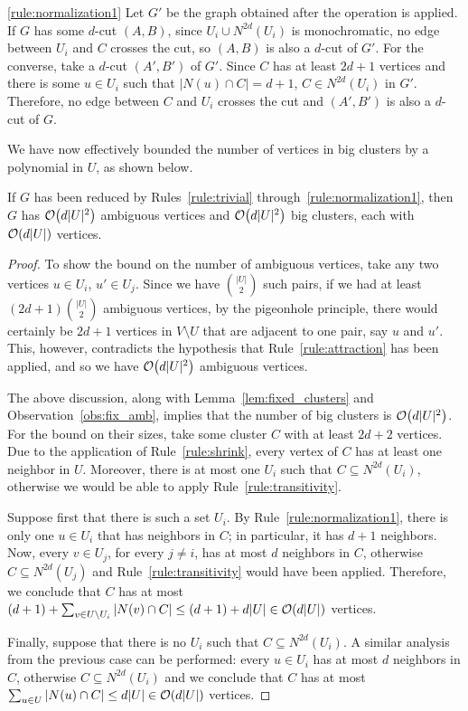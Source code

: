 \begin{sproof}{\ref{rule:normalization1}}
    Let $G'$ be the graph obtained after the operation is applied.
    If $G$ has some $d$-cut $(A,B)$, since $U_i \cup N^{2d}(U_i)$ is monochromatic, no edge between $U_i$ and $C$ crosses the cut, so $(A,B)$ is also a $d$-cut of $G'$.
    For the converse, take a $d$-cut $(A', B')$ of $G'$.
    Since $C$ has at least $2d+1$ vertices and there is some $u \in U_i$ such that $|N(u) \cap C| = d+1$, $C \in N^{2d}(U_i)$ in $G'$.
    Therefore, no edge between $C$ and $U_i$ crosses the cut and $(A', B')$ is also a $d$-cut of $G$.
\end{sproof}

We have now effectively bounded the number of vertices in big clusters by a polynomial in $U$, as shown below.

\begin{lemma}
    \label{lem:bound1}
    If $G$ has been reduced by Rules~\ref{rule:trivial} through~\ref{rule:normalization1}, then $G$ has $\mathcal{O}\!\left(d|U|^2\right)$ ambiguous vertices and $\mathcal{O}\!\left(d|U|^2\right)$ big clusters, each with $\mathcal{O}\!\left(d|U|\right)$ vertices.
\end{lemma}

\begin{proof}
    To show the bound on the number of ambiguous vertices, take any two vertices $u \in U_i$, $u' \in U_j$.
    Since we have $\binom{|U|}{2}$ such pairs, if we had at least $(2d + 1)\binom{|U|}{2}$ ambiguous vertices, by the pigeonhole principle, there would certainly be $2d+1$ vertices in $V \setminus U$ that are adjacent to one pair, say $u$ and $u'$.
    This, however, contradicts the hypothesis that Rule~\ref{rule:attraction} has been applied, and so we have $\mathcal{O}\!\left(d|U|^2\right)$ ambiguous vertices.

    The above discussion, along with Lemma~\ref{lem:fixed_clusters} and Observation~\ref{obs:fix_amb}, implies that the number of big clusters is $\mathcal{O}\!\left(d|U|^2\right)$.
    For the bound on their sizes, take some cluster $C$ with at least $2d + 2$ vertices.
    Due to the application of Rule~\ref{rule:shrink}, every vertex of $C$ has at least one neighbor in $U$.
    Moreover, there is at most one $U_i$ such that $C \subseteq N^{2d}(U_i)$, otherwise we would be able to apply Rule~\ref{rule:transitivity}.

    Suppose first that there is such a set $U_i$.
    By Rule~\ref{rule:normalization1}, there is only one $u \in U_i$ that has neighbors in $C$; in particular, it has $d+1$ neighbors.
    Now, every $v \in U_j$, for every $j\neq i$, has at most $d$ neighbors in $C$, otherwise $C \subseteq N^{2d}(U_j)$ and Rule~\ref{rule:transitivity} would have been applied.
    Therefore, we conclude that $C$ has at most $(d+1) +  \sum_{v \in U \setminus U_i} |N(v) \cap C| \leq (d+1) + d|U| \in \mathcal{O}\!\left(d|U|\right)$ vertices.

    Finally, suppose that there is no $U_i$ such that $C \subseteq N^{2d}(U_i)$.
    A similar analysis from the previous case can be performed: every $u \in U_i$ has at most $d$ neighbors in $C$, otherwise $C \subseteq N^{2d}(U_i)$ and we conclude that $C$ has at most $\sum_{u \in U} |N(u) \cap C| \leq d|U| \in \mathcal{O}\!\left(d|U|\right)$ vertices.
\end{proof}


